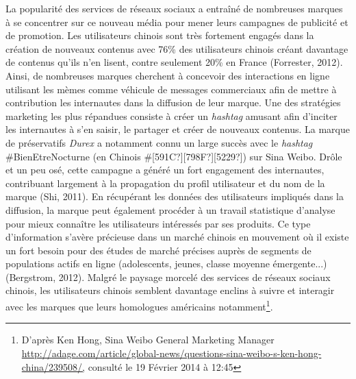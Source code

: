 \textcolor[rgb]{0.0,0.0,0.039215688}{La popularit\'e des services de
r\'eseaux sociaux a entra\^in\'e de nombreuses marques \`a se
concentrer sur ce nouveau m\'edia pour mener leurs campagnes de
publicit\'e et de promotion. Les utilisateurs chinois sont tr\`es
fortement engag\'es dans la cr\'eation de nouveaux contenus avec
}\textcolor[rgb]{0.08627451,0.12941177,0.17254902}{76\% des
utilisateurs chinois cr\'eant davantage de contenus
qu{\textquoteright}ils n{\textquoteright}en lisent, contre seulement
20\% en France}\textcolor[rgb]{0.08627451,0.12941177,0.17254902}{
}\textcolor[rgb]{0.0,0.0,0.039215688}{(Forrester, 2012). Ainsi, de
nombreuses marques cherchent \`a concevoir des interactions en ligne
utilisant les m\`emes comme v\'ehicule de messages commerciaux afin de
mettre \`a contribution les internautes dans la diffusion de leur
marque. Une des strat\'egies marketing les plus r\'epandues consiste
\`a cr\'eer un
}\textit{\textcolor[rgb]{0.0,0.0,0.039215688}{hashtag}}\textcolor[rgb]{0.0,0.0,0.039215688}{
amusant afin d{\textquoteright}inciter les internautes \`a
s{\textquoteright}en saisir, le partager et cr\'eer de nouveaux
contenus. La marque de pr\'eservatifs
}\textit{\textcolor[rgb]{0.0,0.0,0.039215688}{Durex
}}\textcolor[rgb]{0.0,0.0,0.039215688}{a notamment connu un large
succ\`es avec le
}\textit{\textcolor[rgb]{0.0,0.0,0.039215688}{hashtag}}\textcolor[rgb]{0.0,0.0,0.039215688}{
\#BienEtreNocturne (en Chinois
\#}\textcolor[rgb]{0.0,0.0,0.039215688}{[591C?][798F?][5229?])
}\textcolor[rgb]{0.0,0.0,0.039215688}{sur Sina Weibo. Dr\^ole et un peu
os\'e, cette campagne a g\'en\'er\'e un fort engagement des
internautes, contribuant largement \`a la propagation du profil
utilisateur et du nom de la marque (Shi, 2011). En r\'ecup\'erant les
donn\'ees des utilisateurs impliqu\'es dans la diffusion, la marque
peut \'egalement proc\'eder \`a un travail statistique
d{\textquoteright}analyse pour mieux conna\^itre les utilisateurs
int\'eress\'es par ses produits. }Ce type d{\textquoteright}information
s{\textquoteright}av\`ere
\textcolor[rgb]{0.0,0.0,0.039215688}{pr\'ecieuse dans un march\'e
chinois en mouvement o\`u il existe un fort besoin pour des \'etudes de
march\'e pr\'ecises }\textcolor[rgb]{0.0,0.0,0.039215688}{aupr\`es de
segments de }\textcolor[rgb]{0.0,0.0,0.039215688}{populations actifs en
ligne (adolescents, jeunes, classe moyenne \'emergente...) (Bergstrom,
2012). Malgr\'e le paysage morcel\'e }des services de r\'eseaux sociaux
\textcolor[rgb]{0.0,0.0,0.039215688}{chinois}, les utilisateurs chinois
semblent davantage enclins \`a suivre et interagir avec les marques que
leurs homologues am\'ericains notamment\footnote{
D{\textquoteright}apr\`es Ken Hong, Sina Weibo General Marketing
Manager
\url{http://adage.com/article/global-news/questions-sina-weibo-s-ken-hong-china/239508/,}
consult\'e le 19 F\'evrier 2014 \`a 12:45}. 


